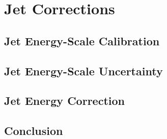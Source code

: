  \section{Jet Corrections}
 \subsection{Jet Energy-Scale Calibration}
 
  \subsection{Jet Energy-Scale Uncertainty}
  
 \subsection{Jet Energy Correction}
 
 \subsection{Conclusion}
%